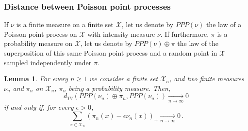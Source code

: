 \documentclass[12pt,a4paper]{article}
\newtheorem{lemma}[theo]{Lemma}
\newtheorem{remark}[theo]{Remark}
\newcommand{\1}[1]{{\mathbf 1}{\{#1\}}}
\newcommand{\8}{{\infty}}
\newcommand{\ind}{{\mathbf{1}}} %
\begin{document}




\subsubsection{Distance between Poisson point processes}

If $\nu$ is a finite measure on a finite set $\mathcal{X}$, let us denote by $PPP(\nu)$ the law of a Poisson point process on $\mathcal{X}$ with intensity measure $\nu$. If furthermore, $\pi$ is a probability measure on $\mathcal{X}$, let us denote by $PPP(\nu) \oplus \pi$ the law of the superposition of this same Poisson point process and a random point in $\mathcal{X}$ sampled independently under $\pi$. 

\begin{lemma}\label{lem:general_cond_dTVto0_for_PPP}
For every $n\ge 1$ we consider a finite set $\mathcal{X}_n$, and two finite measures $\nu_n$ and $\pi_n$ on $\mathcal{X}_n$, $\pi_n$ being a probability measure. Then, 
\begin{equation}
  d_{TV}(PPP(\nu_n) \oplus \pi_n  , PPP(\nu_n) ) \underset{n\to\infty}{\longrightarrow} 0
\end{equation}
if and only if, for every $\epsilon>0$, 
\begin{equation}
  \sum_{x\in \mathcal{X}_n} 
  \left(\pi_n(x)-\epsilon \nu_n(x)\right)_+  
  \underset{n\to\infty}{\longrightarrow} 0\, .
\end{equation}
\end{lemma}


\end{document}
